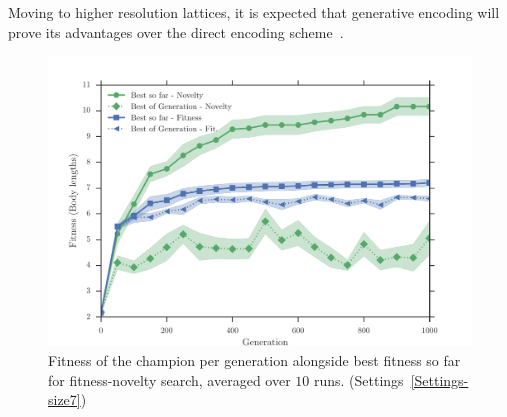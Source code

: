 Moving to higher resolution lattices, it is expected that generative encoding will prove its advantages over the direct encoding scheme~\citep{cheney2013unshackling,stanley2007compositional}. 
\begin{figure}[t!]
\centering
\includegraphics[width=1.0\textwidth]{../Figures/Results/AvgGenerChampNoveltyFitnessSize7.pdf}
\caption{Fitness of the champion per generation alongside best fitness so far for fitness-novelty search, averaged over $10$ runs. (Settings~\ref{Settings-size7})}
\label{fig:AvgGenerChampNoveltyFitnessSize7}
\end{figure}
